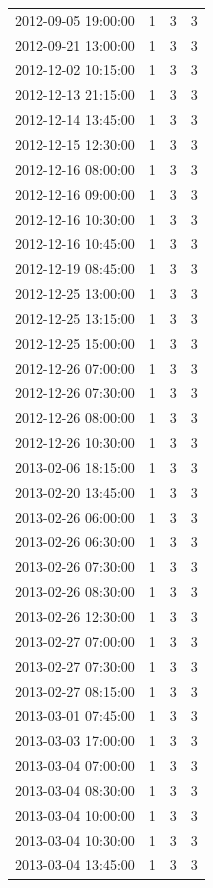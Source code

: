 \begin{tabular}{lrrr}
2012-09-05 19:00:00 & 1 & 3 & 3 \\
2012-09-21 13:00:00 & 1 & 3 & 3 \\
2012-12-02 10:15:00 & 1 & 3 & 3 \\
2012-12-13 21:15:00 & 1 & 3 & 3 \\
2012-12-14 13:45:00 & 1 & 3 & 3 \\
2012-12-15 12:30:00 & 1 & 3 & 3 \\
2012-12-16 08:00:00 & 1 & 3 & 3 \\
2012-12-16 09:00:00 & 1 & 3 & 3 \\
2012-12-16 10:30:00 & 1 & 3 & 3 \\
2012-12-16 10:45:00 & 1 & 3 & 3 \\
2012-12-19 08:45:00 & 1 & 3 & 3 \\
2012-12-25 13:00:00 & 1 & 3 & 3 \\
2012-12-25 13:15:00 & 1 & 3 & 3 \\
2012-12-25 15:00:00 & 1 & 3 & 3 \\
2012-12-26 07:00:00 & 1 & 3 & 3 \\
2012-12-26 07:30:00 & 1 & 3 & 3 \\
2012-12-26 08:00:00 & 1 & 3 & 3 \\
2012-12-26 10:30:00 & 1 & 3 & 3 \\
2013-02-06 18:15:00 & 1 & 3 & 3 \\
2013-02-20 13:45:00 & 1 & 3 & 3 \\
2013-02-26 06:00:00 & 1 & 3 & 3 \\
2013-02-26 06:30:00 & 1 & 3 & 3 \\
2013-02-26 07:30:00 & 1 & 3 & 3 \\
2013-02-26 08:30:00 & 1 & 3 & 3 \\
2013-02-26 12:30:00 & 1 & 3 & 3 \\
2013-02-27 07:00:00 & 1 & 3 & 3 \\
2013-02-27 07:30:00 & 1 & 3 & 3 \\
2013-02-27 08:15:00 & 1 & 3 & 3 \\
2013-03-01 07:45:00 & 1 & 3 & 3 \\
2013-03-03 17:00:00 & 1 & 3 & 3 \\
2013-03-04 07:00:00 & 1 & 3 & 3 \\
2013-03-04 08:30:00 & 1 & 3 & 3 \\
2013-03-04 10:00:00 & 1 & 3 & 3 \\
2013-03-04 10:30:00 & 1 & 3 & 3 \\
2013-03-04 13:45:00 & 1 & 3 & 3 \\

\end{tabular}
